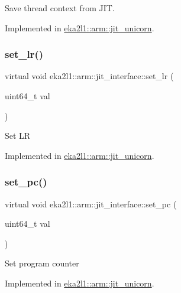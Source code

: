 Save thread context from J\+IT. 

Implemented in \mbox{\hyperlink{classeka2l1_1_1arm_1_1jit__unicorn_a315e75d56daf439ca9914fcf44de5dcf}{eka2l1\+::arm\+::jit\+\_\+unicorn}}.

\mbox{\label{classeka2l1_1_1arm_1_1jit__interface_a4e4da2ac6f5b627c0c7d9d3951edd053}} 
\subsubsection{\texorpdfstring{set\+\_\+lr()}{set\_lr()}}
{\footnotesize\ttfamily virtual void eka2l1\+::arm\+::jit\+\_\+interface\+::set\+\_\+lr (\begin{DoxyParamCaption}\item[{uint64\+\_\+t}]{val }\end{DoxyParamCaption})\hspace{0.3cm}{\ttfamily [pure virtual]}}

Set LR 

Implemented in \mbox{\hyperlink{classeka2l1_1_1arm_1_1jit__unicorn_a73a5362b1004f6c7bcaa4f2580fefb2c}{eka2l1\+::arm\+::jit\+\_\+unicorn}}.

\mbox{\label{classeka2l1_1_1arm_1_1jit__interface_abda1155e6ce73a15e9ccf55a7c2465bb}} 
\subsubsection{\texorpdfstring{set\+\_\+pc()}{set\_pc()}}
{\footnotesize\ttfamily virtual void eka2l1\+::arm\+::jit\+\_\+interface\+::set\+\_\+pc (\begin{DoxyParamCaption}\item[{uint64\+\_\+t}]{val }\end{DoxyParamCaption})\hspace{0.3cm}{\ttfamily [pure virtual]}}

Set program counter 

Implemented in \mbox{\hyperlink{classeka2l1_1_1arm_1_1jit__unicorn_ae5ea9a9c15af2aa73384e845679e1b7a}{eka2l1\+::arm\+::jit\+\_\+unicorn}}.

